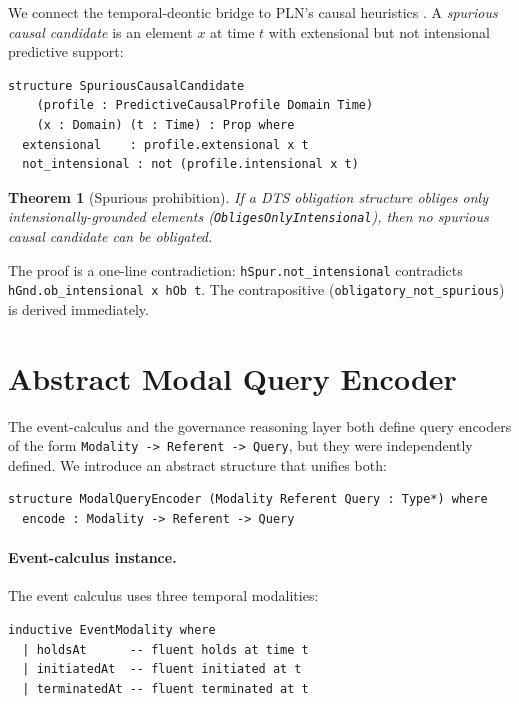 \documentclass[]{article}
\newtheorem{theorem}{Theorem}
\newcommand{\code}[1]{\texttt{#1}}
\newcommand{\DTS}{\textup{DTS}}
\newcommand{\PLN}{\textup{PLN}}
\begin{document}
We connect the temporal-deontic bridge to \PLN{}'s causal heuristics
\cite{GoertzelPLN2008}.
A \emph{spurious causal candidate} is an element $x$ at time $t$ with
extensional but not intensional predictive support:

\begin{lstlisting}
structure SpuriousCausalCandidate
    (profile : PredictiveCausalProfile Domain Time)
    (x : Domain) (t : Time) : Prop where
  extensional    : profile.extensional x t
  not_intensional : not (profile.intensional x t)
\end{lstlisting}

\begin{theorem}[Spurious prohibition]
If a \DTS{} obligation structure obliges only intensionally-grounded elements
(\code{ObligesOnlyIntensional}), then no spurious causal candidate can be
obligated.
\end{theorem}

\noindent
The proof is a one-line contradiction: \code{hSpur.not\_intensional}
contradicts \code{hGnd.ob\_intensional x hOb t}.
The contrapositive (\code{obligatory\_not\_spurious}) is derived immediately.

\section{Abstract Modal Query Encoder}
\label{sec:mqe}

The event-calculus \cite{KowalskiSergot1986,Shanahan1999} and the governance
reasoning layer both define query encoders of the form
\code{Modality -> Referent -> Query}, but they were independently defined.
We introduce an abstract structure that unifies both:

\begin{lstlisting}
structure ModalQueryEncoder (Modality Referent Query : Type*) where
  encode : Modality -> Referent -> Query
\end{lstlisting}

\paragraph{Event-calculus instance.}
The event calculus uses three temporal modalities:

\begin{lstlisting}
inductive EventModality where
  | holdsAt      -- fluent holds at time t
  | initiatedAt  -- fluent initiated at t
  | terminatedAt -- fluent terminated at t
\end{lstlisting}
\end{document}
